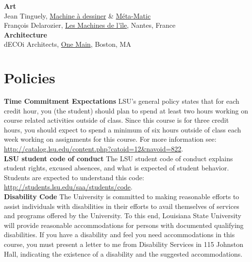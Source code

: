 \documentclass[11pt,article,oneside]{memoir}
\begin{document}
\noindent \textbf{Art}\\
Jean Tinguely, \href{https://www.tinguely.ch/en/sammlung/sammlung.html}{Machine \`{a} dessiner}
\& \href{https://www.tinguely.ch/en/sammlung/sammlung.html}{M\'{e}ta-Matic}\\
François Delarozier, \href{https://www.lesmachines-nantes.fr/en/}{Les Machines de l’\^{i}le}, Nantes, France\\

\noindent \textbf{Architecture}\\
dECOi Architects, \href{http://www.decoi-architects.org/2011/10/onemain/}{One Main}, Boston, MA\\

\clearpage

\section{Policies}

\noindent \textbf{Time Commitment Expectations}
LSU's general policy states that for each credit hour, you (the student) should plan to
spend at least two hours working on course related activities outside of class. Since this course is for three credit hours, you should expect to spend a minimum of six hours outside of class each week working on assignments for this course. For more information see: 
\url{http://catalog.lsu.edu/content.php?catoid=12&navoid=822}.\\

\noindent \textbf{LSU student code of conduct}
The LSU student code of conduct explains student rights, excused absences, and what is expected of student behavior. Students are expected to understand this code:  \url{http://students.lsu.edu/saa/students/code}.\\ %

\noindent \textbf{Disability Code}
The University is committed to making reasonable efforts to assist individuals with disabilities in
their efforts to avail themselves of services and programs offered by the University. To this end,
Louisiana State University will provide reasonable accommodations for persons with
documented qualifying disabilities. If you have a disability and feel you need accommodations in
this course, you must present a letter to me from Disability Services in 115 Johnston Hall,
indicating the existence of a disability and the suggested accommodations.\\
\end{document}
